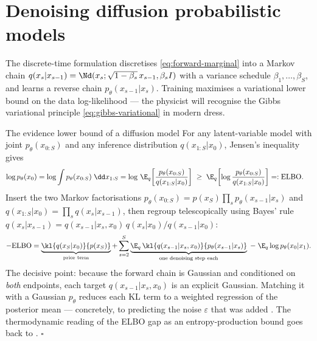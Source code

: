 \section{Denoising diffusion probabilistic models}\label{sec:ddpm}

The discrete-time formulation \citep{sohl2015deep, ho2020denoising}
discretises \eqref{eq:forward-marginal} into a Markov chain
$q(x_s | x_{s-1}) = \Nd(x_s; \sqrt{1 - \beta_s}\, x_{s-1}, \beta_s I)$ with
a variance schedule $\beta_1, \dots, \beta_S$, and learns a reverse chain
$p_\theta(x_{s-1} | x_s)$. Training maximises a variational lower bound on
the data log-likelihood --- the physicist will recognise the Gibbs
variational principle \eqref{eq:gibbs-variational} in modern dress.

\begin{toolbox}{The evidence lower bound of a diffusion model}
For any latent-variable model with joint $p_\theta(x_{0:S})$ and any
inference distribution $q(x_{1:S} | x_0)$, Jensen's inequality gives
\begin{align*}
  \log p_\theta(x_0)
  &= \log \int p_\theta(x_{0:S})\;\dd x_{1:S}
   = \log\, \E_{q}\!\left[
      \frac{p_\theta(x_{0:S})}{q(x_{1:S}|x_0)} \right]
  \;\geq\; \E_{q}\!\left[
      \log \frac{p_\theta(x_{0:S})}{q(x_{1:S}|x_0)} \right]
  =: \mathrm{ELBO}.
\end{align*}
Insert the two Markov factorisations
$p_\theta(x_{0:S}) = p(x_S) \prod_s p_\theta(x_{s-1}|x_s)$ and
$q(x_{1:S}|x_0) = \prod_s q(x_s|x_{s-1})$, then regroup telescopically using
Bayes' rule $q(x_s|x_{s-1}) = q(x_{s-1}|x_s, x_0)\, q(x_s|x_0) /
q(x_{s-1}|x_0)$:
\begin{equation*}
  -\mathrm{ELBO}
  = \underbrace{\kl{q(x_S|x_0)}{p(x_S)}}_{\text{prior term}}
  + \sum_{s=2}^{S}
    \underbrace{\E_q\, \kl{q(x_{s-1}|x_s, x_0)}{p_\theta(x_{s-1}|x_s)}}_{
      \text{one denoising step each}}
  \;-\; \E_q \log p_\theta(x_0 | x_1).
\end{equation*}
The decisive point: because the forward chain is Gaussian and conditioned on
\emph{both} endpoints, each target $q(x_{s-1} | x_s, x_0)$ is an explicit
Gaussian. Matching it with a Gaussian $p_\theta$ reduces each KL term to a
weighted regression of the posterior mean --- concretely, to predicting the
noise $\varepsilon$ that was added \citep{ho2020denoising}. The
thermodynamic reading of the ELBO gap as an entropy-production bound goes
back to \citet{sohl2015deep}. \hfill$\square$
\end{toolbox}

